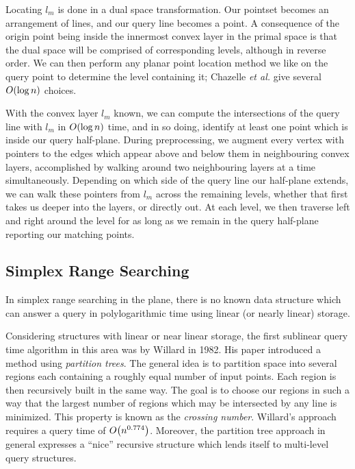 Locating $l_m$ is done in a dual space transformation.
Our pointset becomes an arrangement of lines, and our query line becomes a point.
A consequence of the origin point being inside the innermost convex layer in the primal space is that the dual space will be comprised of corresponding levels, although in reverse order.
We can then perform any planar point location method we like on the query point to determine the level containing it; Chazelle \emph{et al.} give several $O\!\left(\log{n}\right)$ choices.

With the convex layer $l_m$ known, we can compute the intersections of the query line with $l_m$ in $O\!\left(\log{n}\right)$ time, and in so doing, identify at least one point which is inside our query half-plane.
During preprocessing, we augment every vertex with pointers to the edges which appear above and below them in neighbouring convex layers, accomplished by walking around two neighbouring layers at a time simultaneously.
Depending on which side of the query line our half-plane extends, we can walk these pointers from $l_m$ across the remaining levels, whether that first takes us deeper into the layers, or directly out.
At each level, we then traverse left and right around the level for as long as we remain in the query half-plane reporting our matching points.


\subsection*{Simplex Range Searching}

In simplex range searching in the plane, there is no known data structure which can answer a query in polylogarithmic time using linear (or nearly linear) storage.\cite{Agarwal99}  

Considering structures with linear or near linear storage, the first sublinear query time algorithm in this area was by Willard in 1982\cite{Willard82}.
His paper introduced a method using \emph{partition trees}.
The general idea is to partition space into several regions each containing a roughly equal number of input points.
Each region is then recursively built in the same way.
The goal is to choose our regions in such a way that the largest number of regions which may be intersected by any line is minimized.  
This property is known as the \emph{crossing number}.
Willard's approach requires a query time of $O\!\left(n^{0.774}\right)$.
Moreover, the partition tree approach in general expresses a ``nice'' recursive structure which lends itself to multi-level query structures.

